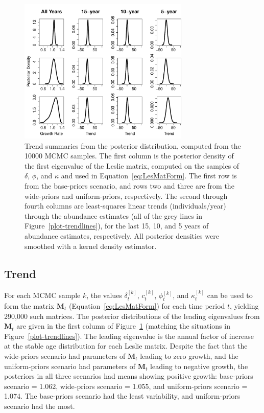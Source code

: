 \documentclass[]{risa}\usepackage[]{graphicx}\usepackage[]{color}
\def\bM{\mathbf{M}}
\begin{document}



\begin{figure}[b]
\centerline{
  \includegraphics[width=3.2in]{plot-histtrend-1.pdf}
}
\caption{Trend summaries from the posterior distribution, computed from the 10000 MCMC samples. The first column is the posterior density of the first eigenvalue of the Leslie matrix, computed on the samples of $\delta$, $\phi$, and $\kappa$ and used in Equation~\ref{eq:LesMatForm}.  The first row is from the base-priors scenario, and rows two and three are from the wide-priors and uniform-priors, respectively.  The second through fourth columns are least-squares linear trends (individuals/year) through the abundance estimates (all of the grey lines in Figure~\ref{plot-trendlines}), for the last 15, 10, and 5 years of abundance estimates, respectively. All posterior densities were smoothed with a kernel density estimator.}
\label{plot-histtrend}         
\end{figure}

\subsection{Trend}

For each MCMC sample $k$, the values $\delta_t^{[k]}$, $c_t^{[k]}$, $\phi_t^{[k]}$, and $\kappa_t^{[k]}$ can be used to form the matrix $\bM_t$ (Equation~\ref{eq:LesMatForm}) for each time period $t$, yielding 290,000 such matrices.  The posterior distributions of the leading eigenvalues from $\bM_t$ are given in the first column of Figure~\ref{plot-histtrend} (matching the situations in Figure~\ref{plot-trendlines}). The leading eigenvalue is the annual factor of increase at the stable age distribution for each Leslie matrix. Despite the fact that the wide-priors scenario had parameters of $\bM_t$ leading to zero growth, and the uniform-priors scenario had parameters of $\bM_t$ leading to negative growth, the posteriors in all three scenarios had means showing positive growth: base-priors scenario  = 1.062, wide-priors scenario = 1.055, and uniform-priors scenario = 1.074.  The base-priors scenario had the least variability, and uniform-priors scenario had the most.
\end{document}

